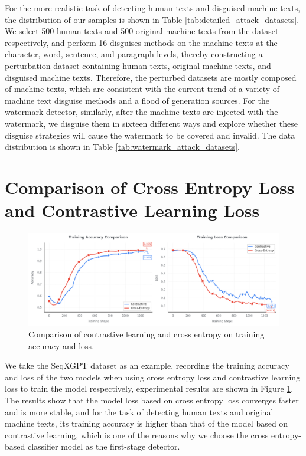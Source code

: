 \documentclass[11pt]{article}
\begin{document}
For the more realistic task of detecting human texts and disguised machine texts, the distribution of our samples is shown in Table \ref{tab:detailed_attack_datasets}. We select 500 human texts and 500 original machine texts from the dataset respectively, and perform 16 disguises methods on the machine texts at the character, word, sentence, and paragraph levels, thereby constructing a perturbation dataset containing human texts, original machine texts, and disguised machine texts. Therefore, the perturbed datasets are mostly composed of machine texts, which are consistent with the current trend of a variety of machine text disguise methods and a flood of generation sources. For the watermark detector, similarly, after the machine texts are injected with the watermark, we disguise them in sixteen different ways and explore whether these disguise strategies will cause the watermark to be covered and invalid. The data distribution is shown in Table \ref{tab:watermark_attack_datasets}.

\section{Comparison of Cross Entropy Loss and Contrastive Learning Loss}
\label{subsec:loss_appendix}
\begin{figure}
	\centering
	\includegraphics[width=1.0\linewidth]{pics/loss_vs.png}
	\caption{Comparison of contrastive learning and cross entropy on training accuracy and loss.}
\label{fig:loss_compare}
\end{figure}
We take the SeqXGPT dataset as an example, recording the training accuracy and loss of the two models when using cross entropy loss and contrastive learning loss to train the model respectively, experimental results are shown in Figure \ref{fig:loss_compare}. The results show that the model loss based on cross entropy loss converges faster and is more stable, and for the task of detecting human texts and original machine texts, its training accuracy is higher than that of the model based on contrastive learning, which is one of the reasons why we choose the cross entropy-based classifier model as the first-stage detector.
\end{document}
